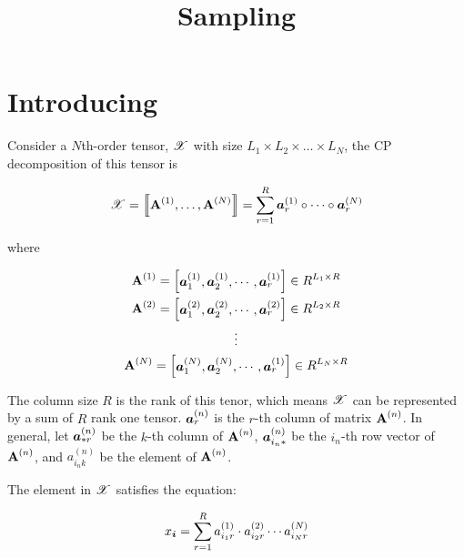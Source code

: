 \documentclass{article}
\newcommand{\Sca}[3]{{#1}^{(#2)}_{i_#2#3}}%
\newcommand{\T}[1]{\boldsymbol{\mathscr{\MakeUppercase{#1}}}}%
\newcommand{\V}[1]{{\bm{{\MakeLowercase{#1}}}}}%
\newcommand{\VnC}[3]{\V{#1}^{(#2)}_{#3}}%
\newcommand{\Varow}[1]{\V{a}^{(#1)}_{i_#1*}}
\newcommand{\Vacol}[1]{\V{a}^{(#1)}_{*r}}
\newcommand{\M}[1]{{\bm{\mathbf{\MakeUppercase{#1}}}}}%
\newcommand{\Mn}[2]{\M{#1}^{(#2)}}%
\newcommand{\KT}[1]{\left\llbracket #1 \right\rrbracket}
\begin{document}
\title{Sampling}
\date{}
\author{}
\maketitle



\section{Introducing}
Consider a $N$th-order tensor, $\T{X}$ with size $L_1\times L_2\times\ldots\times L_N$, the CP decomposition of this tensor is

\begin{equation}\label{eq:CPDecomposition}
\T{X}= \KT{ \Mn{A}{1},\dots,\Mn{A}{N}} =
\sum_{r=1}^{R}\VnC{A}{1}{r} \circ \cdots \circ \VnC{A}{N}{r}
\end{equation}

where

\begin{gather*}\label{eq:ColumnVectorsForm}
\M{A}^{(1)} =
\begin{bmatrix}\VnC{a}{1}{1},\VnC{a}{1}{2},\cdots,\VnC{a}{1}{r}\end{bmatrix}\in R^{L_1\times R}\\
\M{A}^{(2)} =
\begin{bmatrix}\VnC{a}{2}{1},\VnC{a}{2}{2},\cdots,\VnC{a}{2}{r}\end{bmatrix}\in R^{L_2\times R}\\
\vdots\\
\M{A}^{(N)} =
\begin{bmatrix}\VnC{a}{N}{1},\VnC{a}{N}{2},\cdots,\VnC{a}{1}{r}\end{bmatrix}\in R^{L_N\times R}\\
\end{gather*}

The column size $R$ is the rank of this tenor, which means $\T{X}$ can be represented by a sum of $R$ rank one tensor. $\VnC{a}{n}{r}$ is the $r$-th column of matrix $\Mn{A}{n}$.
In general, let $\Vacol{n}$ be the $k$-th column of $\M{A}^{(n)}$, $\Varow{n}$ be the $i_n$-th row vector of $\M{A}^{(n)}$, and $\Sca{a}{n}{k}$ be the element of $\M{A}^{(n)}$.

The element in $\T{X}$ satisfies the equation:

\begin{equation}\label{eq:ValueInTensor}
x_\V{i} = \sum_{r=1}^{R}\Sca{a}{1}{r}\cdot\Sca{a}{2}{r}\cdots\Sca{a}{N}{r}
\end{equation}
\end{document}
